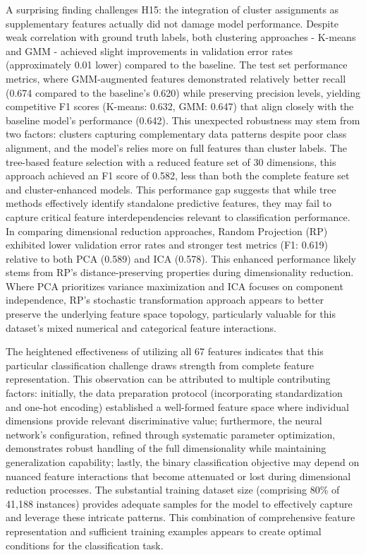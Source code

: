 \documentclass[conference]{IEEEtran}
\begin{document}
A surprising finding challenges H15: the integration of cluster assignments as supplementary features actually did not damage model performance. Despite weak correlation with ground truth labels, both clustering approaches - K-means and GMM - achieved slight improvements in validation error rates (approximately 0.01 lower) compared to the baseline. The test set performance metrics, where GMM-augmented features demonstrated relatively better recall (0.674 compared to the baseline's 0.620) while preserving precision levels, yielding competitive F1 scores (K-means: 0.632, GMM: 0.647) that align closely with the baseline model's performance (0.642). This unexpected robustness may stem from two factors: clusters capturing complementary data patterns despite poor class alignment, and the model's relies more on full features than cluster labels. 
The tree-based feature selection with a reduced feature set of 30 dimensions, this approach achieved an F1 score of 0.582, less than both the complete feature set and cluster-enhanced models. This performance gap suggests that while tree methods effectively identify standalone predictive features, they may fail to capture critical feature interdependencies relevant to classification performance.
In comparing dimensional reduction approaches, Random Projection (RP) exhibited lower validation error rates and stronger test metrics (F1: 0.619) relative to both PCA (0.589) and ICA (0.578). This enhanced performance likely stems from RP's distance-preserving properties during dimensionality reduction. Where PCA prioritizes variance maximization and ICA focuses on component independence, RP's stochastic transformation approach appears to better preserve the underlying feature space topology, particularly valuable for this dataset's mixed numerical and categorical feature interactions.

The heightened effectiveness of utilizing all 67 features indicates that this particular classification challenge draws strength from complete feature representation. This observation can be attributed to multiple contributing factors: initially, the data preparation protocol (incorporating standardization and one-hot encoding) established a well-formed feature space where individual dimensions provide relevant discriminative value; furthermore, the neural network's configuration, refined through systematic parameter optimization, demonstrates robust handling of the full dimensionality while maintaining generalization capability; lastly, the binary classification objective may depend on nuanced feature interactions that become attenuated or lost during dimensional reduction processes. The substantial training dataset size (comprising 80\% of 41,188 instances) provides adequate samples for the model to effectively capture and leverage these intricate patterns. This combination of comprehensive feature representation and sufficient training examples appears to create optimal conditions for the classification task.
\end{document}
